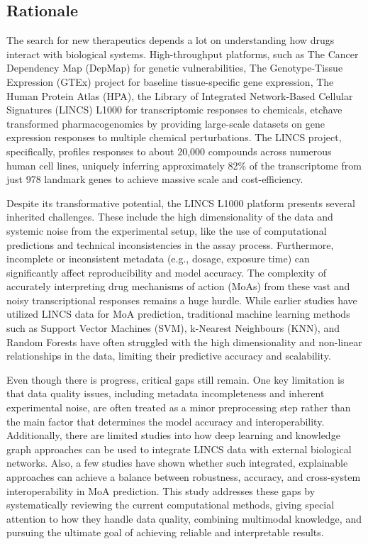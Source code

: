 \documentclass[twocolumn]{article}
\begin{document}
\subsection{Rationale}
The search for new therapeutics depends a lot on understanding how drugs interact with biological systems. High-throughput platforms, such as The Cancer Dependency Map (DepMap) for genetic vulnerabilities, The Genotype-Tissue Expression (GTEx) project for baseline tissue-specific gene expression, The Human Protein Atlas (HPA), the Library of Integrated Network-Based Cellular Signatures (LINCS) L1000 for transcriptomic responses to chemicals, etc\. have transformed pharmacogenomics by providing large-scale datasets on gene expression responses to multiple chemical perturbations. The LINCS project, specifically, profiles responses to about 20,000 compounds across numerous human cell lines, uniquely inferring approximately 82\% of the transcriptome from just 978 landmark genes to achieve massive scale and cost-efficiency\cite{subramanian2017next,mcdermott2019deep}.

Despite its transformative potential, the LINCS L1000 platform presents several inherited challenges. These include the high dimensionality of the data and systemic noise from the experimental setup, like the use of computational predictions and technical inconsistencies in the assay process. Furthermore, incomplete or inconsistent metadata (e.g., dosage, exposure time) can significantly affect reproducibility and model accuracy\cite{stathias2018sustainable}. The complexity of accurately interpreting drug mechanisms of action (MoAs) from these vast and noisy transcriptional responses remains a huge hurdle. While earlier studies have utilized LINCS data for MoA prediction\cite{everett2023combining,gao2022deep,el2017integrative,wang2016drug,subramanian2017next,wu2022deep,liao2023open}, traditional machine learning methods such as Support Vector Machines (SVM), k-Nearest Neighbours (KNN), and Random Forests have often struggled with the high dimensionality and non-linear relationships in the data, limiting their predictive accuracy and scalability\cite{li2020deep,everett2023combining}.

Even though there is progress, critical gaps still remain. One key limitation is that data quality issues, including metadata incompleteness and inherent experimental noise, are often treated as a minor preprocessing step rather than the main factor that determines the model accuracy and interoperability\cite{stathias2018sustainable}. Additionally, there are limited studies into how deep learning and knowledge graph approaches can be used to integrate LINCS data with external biological networks. Also, a few studies have shown whether such integrated, explainable approaches can achieve a balance between robustness, accuracy, and cross-system interoperability in MoA prediction\cite{ye2025knowledge,evangelista2023toxicology,wu2022deep}. This study addresses these gaps by systematically reviewing the current computational methods, giving special attention to how they handle data quality, combining multimodal knowledge, and pursuing the ultimate goal of achieving reliable and interpretable results.
\end{document}

